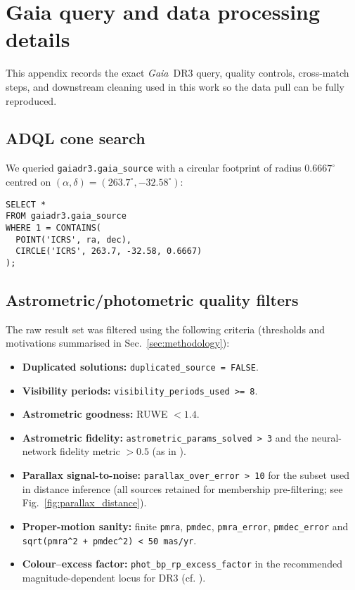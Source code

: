 \documentclass[../main.tex]{subfiles}
\begin{document}
\renewcommand{\thesection}{A\arabic{section}}
\renewcommand{\thetable}{A\arabic{section}.\arabic{table}}
\renewcommand{\thefigure}{A\arabic{section}.\arabic{figure}}

\section{Gaia query and data processing details}
\label{app:data}

This appendix records the exact \textit{Gaia}~DR3 query, quality controls, cross-match steps, and downstream cleaning used in this work so the data pull can be fully reproduced.

\subsection{ADQL cone search}
We queried \texttt{gaiadr3.gaia\_source} with a circular footprint of radius $0.6667^{\circ}$ centred on $(\alpha,\delta)=(263.7^{\circ},-32.58^{\circ})$:
\begin{verbatim}
SELECT *
FROM gaiadr3.gaia_source
WHERE 1 = CONTAINS(
  POINT('ICRS', ra, dec),
  CIRCLE('ICRS', 263.7, -32.58, 0.6667)
);
\end{verbatim}

\subsection{Astrometric/photometric quality filters}
\label{app:data:quality}
The raw result set was filtered using the following criteria (thresholds and motivations summarised in Sec.~\ref{sec:methodology}):
\begin{itemize}
  \item \textbf{Duplicated solutions:} \verb|duplicated_source = FALSE|.
  \item \textbf{Visibility periods:} \verb|visibility_periods_used >= 8|.
  \item \textbf{Astrometric goodness:} RUWE $< 1.4$.
  \item \textbf{Astrometric fidelity:} \verb|astrometric_params_solved > 3| and the neural-network fidelity metric $>0.5$ (as in \citealt{2022MNRAS.510.2597R}).
  \item \textbf{Parallax signal-to-noise:} \verb|parallax_over_error > 10| for the subset used in distance inference (all sources retained for membership pre-filtering; see Fig.~\ref{fig:parallax_distance}).
  \item \textbf{Proper-motion sanity:} finite \verb|pmra|, \verb|pmdec|, \verb|pmra_error|, \verb|pmdec_error| and \verb|sqrt(pmra^2 + pmdec^2) < 50 mas/yr|.
  \item \textbf{Colour–excess factor:} \verb|phot_bp_rp_excess_factor| in the recommended magnitude-dependent locus for DR3 (cf. \citealt{2021A&A...649A...3R}).
\end{itemize}
\end{document}
